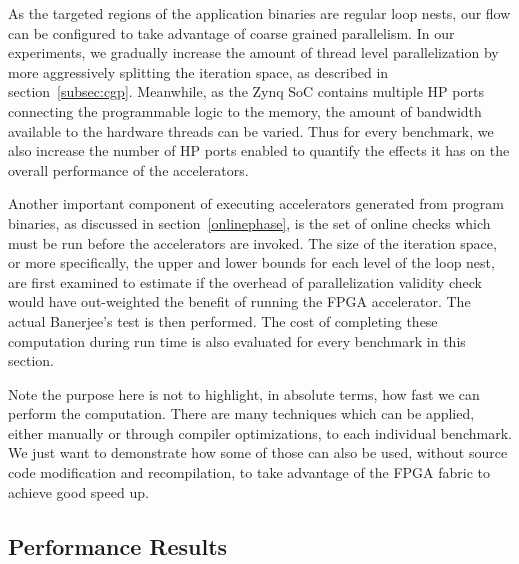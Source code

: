 As the targeted regions of the application binaries are regular loop nests, our flow can be configured to take advantage of coarse grained parallelism. In our experiments, we  gradually increase the amount of
thread level parallelization by more aggressively splitting the iteration space, as described in section~\ref{subsec:cgp}. Meanwhile, as the Zynq SoC contains multiple HP ports connecting the programmable logic to the memory, the amount of bandwidth available to the hardware threads can be varied. Thus for every benchmark, we also increase the number of HP ports enabled to quantify the effects it has on the overall performance of the accelerators.

Another important component of executing accelerators generated from program binaries, as discussed in section~\ref{onlinephase}, is the set of online checks which must be run before the accelerators are invoked.
The size of the iteration space, or more specifically, the upper and lower bounds for each level of the loop nest, are first examined to estimate if the overhead of parallelization validity check would have out-weighted the benefit of running the FPGA accelerator.
The actual Banerjee's test is then performed. The cost of completing these computation during run time is also evaluated for every benchmark in this section.

Note the purpose here is not to highlight, in absolute terms, how fast we can perform the computation. There are many techniques which can be applied, either manually or through compiler optimizations, to each individual benchmark. We just want to demonstrate how some of those can also be used, without source code modification and recompilation, to take advantage of the FPGA fabric to achieve good speed up.





\subsection{Performance Results}

